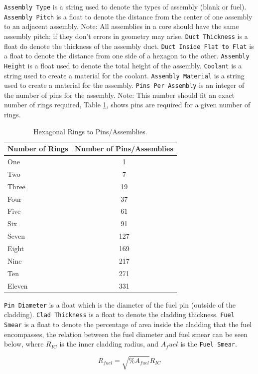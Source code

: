 \documentclass{article}
\begin{document}
\verb|Assembly Type| is a string used to denote the types of assembly (blank or fuel). \verb|Assembly Pitch| is a float to denote the distance from the center of one assembly to an adjacent assembly. Note: All assemblies in a core should have the same assembly pitch; if they don't errors in geometry may arise. \verb|Duct Thickness| is a float do denote the thickness of the assembly duct. \verb|Duct Inside Flat to Flat| is a float to denote the distance from one side of a hexagon to the other. \verb|Assembly Height| is a float used to denote the total height of the assembly. \verb|Coolant| is a string used to create a material for the coolant. \verb|Assembly Material| is a string used to create a material for the assembly. \verb|Pins Per Assembly| is an integer of the number of pins for the assembly. Note: This number should fit an exact number of rings required, Table \ref{tab:rings}, shows pins are required for a given number of rings.

\begin{table}
	\centering
	\caption{Hexagonal Rings to Pins/Assemblies.}
	\begin{tabular}{lc}\toprule
		Number of Rings & Number of Pins/Assemblies 
		\\
		\hline
		One  & 1 
		\\
		Two & 7
		\\
		Three & 19 
		\\
		Four & 37
		\\
		Five & 61 
		\\
		Six & 91
		\\
		Seven & 127
		\\
	    Eight & 169
		\\
		Nine & 217 
		\\
		Ten & 271
		\\
		Eleven & 331
		\\		
		\bottomrule
	\end{tabular}
	\label{tab:rings}
\end{table}

\verb|Pin Diameter| is a float which is the diameter of the fuel pin (outside of the cladding). \verb|Clad Thickness| is a float to denote the cladding thickness. \verb|Fuel Smear| is a float to denote the percentage of area inside the cladding that the fuel encompasses, the relation between the fuel diameter and fuel smear can be seen below, where $R_{IC}$ is the inner cladding radius, and $A_fuel$ is the \verb|Fuel Smear|.

\begin{equation}
    R_{fuel} = \sqrt{\%A_{fuel}}R_{IC}
\end{equation}
\end{document}

